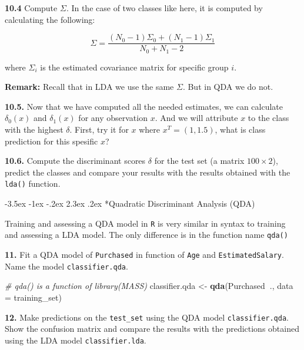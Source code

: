\documentclass[]{book}
\makeatletter
\newenvironment{Shaded}{\begin{snugshade}}{\end{snugshade}}
\newcommand{\KeywordTok}[1]{\textcolor[rgb]{0.13,0.29,0.53}{\textbf{#1}}}
\newcommand{\DataTypeTok}[1]{\textcolor[rgb]{0.13,0.29,0.53}{#1}}
\newcommand{\StringTok}[1]{\textcolor[rgb]{0.31,0.60,0.02}{#1}}
\newcommand{\CommentTok}[1]{\textcolor[rgb]{0.56,0.35,0.01}{\textit{#1}}}
\newcommand{\OperatorTok}[1]{\textcolor[rgb]{0.81,0.36,0.00}{\textbf{#1}}}
\newcommand{\NormalTok}[1]{#1}
\renewcommand\section{\@startsection {section}{1}{\z@}%
                                   {-3.5ex \@plus -1ex \@minus -.2ex}%
                                   {2.3ex \@plus.2ex}%
                                   {\normalfont\Large\bfseries\color{ForestGreen}}}
\theoremstyle{definition}
\theoremstyle{definition}
\theoremstyle{definition}
\theoremstyle{remark}
\makeatother
\begin{document}
\textbf{10.4} Compute \(\Sigma\). In the case of two classes like here,
it is computed by calculating the following:

\[\Sigma = \frac{(N_0-1)\Sigma_0 + (N_1-1)\Sigma_1}{N_0+N_1-2}\]

where \(\Sigma_i\) is the estimated covariance matrix for specific group
\(i\).

\textbf{Remark:} Recall that in LDA we use the same \(\Sigma\). But in
QDA we do not.

\textbf{10.5.} Now that we have computed all the needed estimates, we
can calculate \(\delta_0(x)\) and \(\delta_1(x)\) for any observation
\(x\). And we will attribute \(x\) to the class with the highest
\(\delta\). First, try it for \(x\) where \(x^T=(1,1.5)\), what is class
prediction for this spesific \(x\)?

\textbf{10.6.} Compute the discriminant scores \(\delta\) for the test
set (a matrix \(100\times 2\)), predict the classes and compare your
results with the results obtained with the \texttt{lda()} function.

\section*{Quadratic Discriminant Analysis
(QDA)}\label{quadratic-discriminant-analysis-qda-1}

Training and assessing a QDA model in \texttt{R} is very similar in
syntax to training and assessing a LDA model. The only difference is in
the function name \texttt{qda()}

\textbf{11.} Fit a QDA model of \texttt{Purchased} in function of
\texttt{Age} and \texttt{EstimatedSalary}. Name the model
\texttt{classifier.qda}.

\begin{Shaded}
\begin{Highlighting}[]
\CommentTok{# qda() is a function of library(MASS)}
\NormalTok{classifier.qda <-}\StringTok{ }\KeywordTok{qda}\NormalTok{(Purchased}\OperatorTok{~}\NormalTok{., }\DataTypeTok{data =}\NormalTok{ training_set)}
\end{Highlighting}
\end{Shaded}

\textbf{12.} Make predictions on the \texttt{test\_set} using the QDA
model \texttt{classifier.qda}. Show the confusion matrix and compare the
results with the predictions obtained using the LDA model
\texttt{classifier.lda}.
\end{document}
